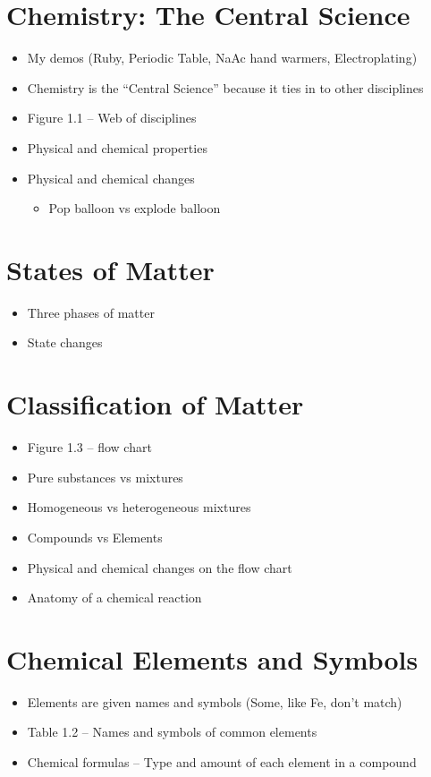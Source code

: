 \documentclass[12pt, openany, letterpaper]{memoir}
\begin{document}
\section{Chemistry: The Central Science}
\begin{itemize}
	\item My demos (Ruby, Periodic Table, NaAc hand warmers, Electroplating)
	\item Chemistry is the ``Central Science'' because it ties in to other disciplines
	\item Figure 1.1 -- Web of disciplines
	\item Physical and chemical properties
	\item Physical and chemical changes
		\begin{itemize}
			\item Pop balloon vs explode balloon
		\end{itemize}	
\end{itemize}

\section{States of Matter}
\begin{itemize}
	\item Three phases of matter
	\item State changes
	
\end{itemize}

\section{Classification of Matter}
\begin{itemize}
	\item Figure 1.3 -- flow chart
	\item Pure substances vs mixtures
	\item Homogeneous vs heterogeneous mixtures
	\item Compounds vs Elements
	\item Physical and chemical changes on the flow chart
	\item Anatomy of a chemical reaction
\end{itemize}

\section{Chemical Elements and Symbols}
\begin{itemize}
	\item Elements are given names and symbols (Some, like Fe, don't match)
	\item Table 1.2 -- Names and symbols of common elements
	\item Chemical formulas -- Type and amount of each element in a compound
\end{itemize}
\end{document}
